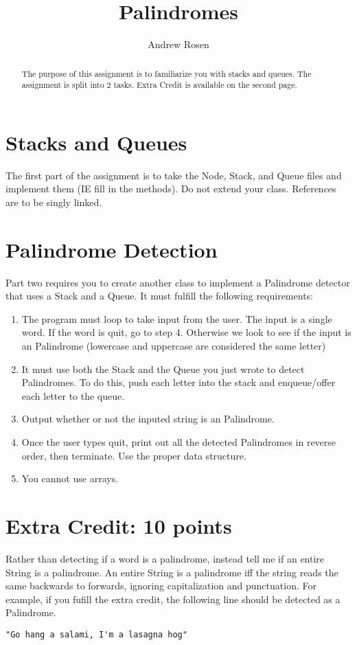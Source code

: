 \documentclass[10pt,letterpaper]{article}
\author{Andrew Rosen}
\title{Palindromes}
\date{}
\begin{document}
\maketitle

\begin{abstract}
	The purpose of this assignment is to familiarize you with stacks and queues.  The assignment is split into 2 tasks.  Extra Credit is available on the second page.
\end{abstract}



\section{Stacks and Queues}
The first part of the assignment is to take the Node, Stack, and Queue files and implement them (IE fill in the methods).  
Do not extend your class.
References are to be singly linked.  

\section{Palindrome Detection}
Part two requires you to create another class to implement a Palindrome detector that uses a Stack and a Queue.  
It must fulfill the following requirements:


\begin{enumerate}
	\item The program must loop to take input from the user.  The input is a single word.  If the word is quit, go to step 4.  Otherwise we look to see if the input is an Palindrome (lowercase and uppercase are considered the same letter)
	\item It must use both the Stack and the Queue you just wrote to detect Palindromes.  To do this, push each letter into the stack and enqueue/offer each letter to the queue. 
	\item  Output whether or not the inputed string is an Palindrome.
	\item Once the user types quit, print out all the detected Palindromes in reverse order, then terminate.  Use the proper data structure.
	\item You cannot use arrays.
\end{enumerate}


\newpage
\section{Extra Credit: 10 points}
Rather than detecting if a word is a palindrome, instead tell me if an entire String is a palindrome.  An entire String is a palindrome iff the string reads the same backwards to forwards, ignoring capitalization and punctuation. For example, if you fufill the extra credit, the following line should be detected as a Palindrome.

\begin{verbatim}
"Go hang a salami, I'm a lasagna hog"
\end{verbatim}
	
\end{document}
